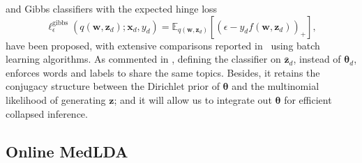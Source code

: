 \documentclass[twoside,11pt]{article}
\newcommand{\xv}{\bm{x}}
\newcommand{\zv}{\bm{z}}
\newcommand{\wv}{\bm{w}}
\newcommand{\thetav}{\bm{\theta}}
\begin{document}
and Gibbs classifiers with the expected hinge loss
\begin{equation}  \label{eq:batch_gibbs_loss}
\ell^\text{gibbs}_{\epsilon}(q(\wv, \zv_d); \xv_d, y_d) = \mathbb{E}_{q(\wv, \zv_d)}\left[ \left( \epsilon - y_d f(\bm{w}, \bm{z}_d) \right)_+ \right],
\end{equation}
have been proposed, with extensive comparisons reported in~\cite{zhugibbs2013} using batch learning algorithms. As commented in \citep{chang2010hierarchical}, defining the classifier on $\bar{\zv}_d$, instead of $\thetav_d$, enforces words and labels to share the same topics. Besides, it retains the conjugacy structure between the Dirichlet prior of $\thetav$ and the multinomial likelihood of generating $\bm{z}$; and it will allow us to integrate out $\thetav$ for efficient collapsed inference.

\subsection{Online MedLDA} \label{sec:medlda}
\end{document}
